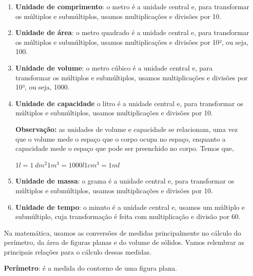 \begin{enumerate}
\item \textbf{Unidade de comprimento}: o metro é a unidade central e, para
transformar os múltiplos e submúltiplos, usamos multiplicações e
divisões por 10.

\item \textbf{Unidade de área}: o metro quadrado é a unidade central e, para
transformar os múltiplos e submúltiplos, usamos multiplicações e
divisões por 10², ou seja, 100.

\item \textbf{Unidade de volume}: o metro cúbico é a unidade central e, para
transformar os múltiplos e submúltiplos, usamos multiplicações e
divisões por 10³, ou seja, 1000.

\item \textbf{Unidade de capacidade} o litro é a unidade central e, para
transformar os múltiplos e submúltiplos, usamos multiplicações e
divisões por 10.

\textbf{Observação:} as unidades de volume e capacidade se relacionam,
uma vez que o volume mede o espaço que o corpo ocupa no espaço, enquanto
a capacidade mede o espaço que pode ser preenchido no corpo. Temos que,

$1l = 1\ dm^{2}1m^{3} = 1000l1cm^{3} = 1ml$

\item \textbf{Unidade de massa}: o grama é a unidade central e, para transformar
os múltiplos e submúltiplos, usamos multiplicações e divisões por 10.

\item \textbf{Unidade de tempo}: o minuto é a unidade central e, usamos um
múltiplo e submúltiplo, cuja transformação é feita com multiplicação e
divisão por 60.

\end{enumerate}


Na matemática, usamos as conversões de medidas principalmente no cálculo
do perímetro, da área de figuras planas e do volume de sólidos. Vamos
relembrar as principais relações para o cálculo dessas medidas.

\textbf{Perímetro}: é a medida do contorno de uma figura plana.


